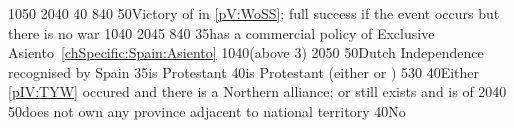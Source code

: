 %
{10}{50}{\EU@objSpanishNetherlands}%
%
{20}{40}{\EU@objSpanishWorld}%
%
{}{40}{\EU@objPortugalAnnexed}%
%
{8}{40}{\EU@objMonopolyZone}%
%
%
%
{}{50}{Victory of \paysmajeurEspagne in \ref{pV:WoSS}; full success if the
  event occurs but there is no war}%
%
{10}{40}{\EU@objOuterProvinces}%
%
{20}{45}{\EU@objSpanishWorld}%
%
%
{8}{40}{\EU@objMonopolyZone}%
%
%
%
{}{35}{\paysmajeurEspagne has a commercial policy of Exclusive
  Asiento~\ref{chSpecific:Spain:Asiento}}%
%
{10}{40}{\EU@objOuterProvinces (above 3)}%
%
{20}{50}{\EU@objSpanishWorld}%
%
%
%
%
%
%
%
{}{50}{Dutch Independence recognised by Spain}%
%
{}{35}{\paysmajeurFrance is Protestant}%
%
{}{40}{\paysmajeurAngleterre is Protestant (either \PROTANG or \PROTPUR)}%
%
%
%
%
%
{5}{30}{\EU@objBaltiqueTrade}%
%
{}{40}{Either \ref{pIV:TYW} occured and there is a Northern \HRE alliance; or
  \payshanse still exists and is \VASSAL of \paysmajeurHollande}%
%
{20}{40}{\EU@objNoActNavigation}%
%
%
%
%
%
{}{50}{\paysmajeurFrance does not own any province adjacent to
  \paysmajeurHollande national territory}%
%
{}{40}{No \EU@objEastMalacca}%
